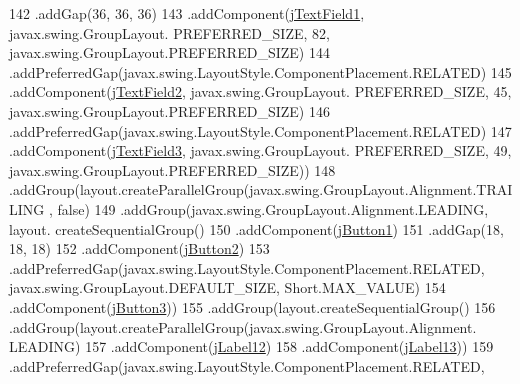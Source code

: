 \begin{DoxyCode}
142                                 .addGap(36, 36, 36)
143                                 .addComponent(\mbox{\hyperlink{class_interfaz_package_1_1_verificar_libro_a0056a9edc1fada73cb6c0ce0ec712df0}{jTextField1}}, javax.swing.GroupLayout.
      PREFERRED\_SIZE, 82, javax.swing.GroupLayout.PREFERRED\_SIZE)
144                                 .addPreferredGap(javax.swing.LayoutStyle.ComponentPlacement.RELATED)
145                                 .addComponent(\mbox{\hyperlink{class_interfaz_package_1_1_verificar_libro_a3ad7fdfe6c4d2e934089b98775f6afb9}{jTextField2}}, javax.swing.GroupLayout.
      PREFERRED\_SIZE, 45, javax.swing.GroupLayout.PREFERRED\_SIZE)
146                                 .addPreferredGap(javax.swing.LayoutStyle.ComponentPlacement.RELATED)
147                                 .addComponent(\mbox{\hyperlink{class_interfaz_package_1_1_verificar_libro_ade0c8f7abc79d9be6cedf3651f98b597}{jTextField3}}, javax.swing.GroupLayout.
      PREFERRED\_SIZE, 49, javax.swing.GroupLayout.PREFERRED\_SIZE))
148                             .addGroup(layout.createParallelGroup(javax.swing.GroupLayout.Alignment.TRAILING
      , \textcolor{keyword}{false})
149                                 .addGroup(javax.swing.GroupLayout.Alignment.LEADING, layout.
      createSequentialGroup()
150                                     .addComponent(\mbox{\hyperlink{class_interfaz_package_1_1_verificar_libro_a5795c2ef06a892f54b964cccdaa87bac}{jButton1}})
151                                     .addGap(18, 18, 18)
152                                     .addComponent(\mbox{\hyperlink{class_interfaz_package_1_1_verificar_libro_a35a502b6b4c12dee0f50c5409271d275}{jButton2}})
153                                     .addPreferredGap(javax.swing.LayoutStyle.ComponentPlacement.RELATED, 
      javax.swing.GroupLayout.DEFAULT\_SIZE, Short.MAX\_VALUE)
154                                     .addComponent(\mbox{\hyperlink{class_interfaz_package_1_1_verificar_libro_a71325c9a930cd968c2b6ce4abc7e8129}{jButton3}}))
155                                 .addGroup(layout.createSequentialGroup()
156                                     .addGroup(layout.createParallelGroup(javax.swing.GroupLayout.Alignment.
      LEADING)
157                                         .addComponent(\mbox{\hyperlink{class_interfaz_package_1_1_verificar_libro_abc6a3ed061a0f7f051470750826cda02}{jLabel12}})
158                                         .addComponent(\mbox{\hyperlink{class_interfaz_package_1_1_verificar_libro_a46332053f952c0ec6ca5dc7b744e135d}{jLabel13}}))
159                                     .addPreferredGap(javax.swing.LayoutStyle.ComponentPlacement.RELATED, 

\end{DoxyCode}
